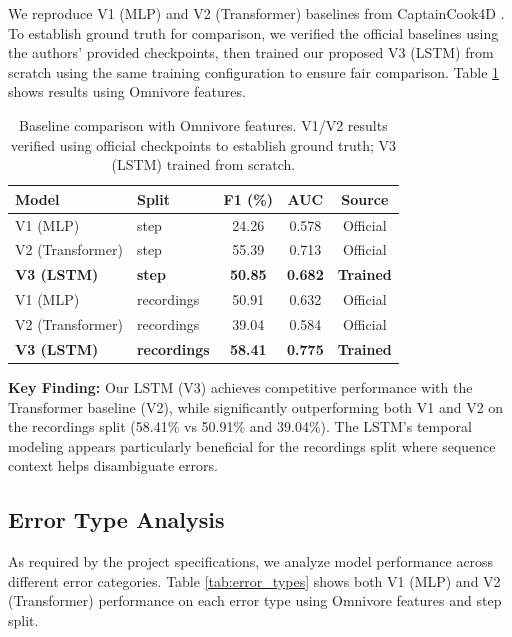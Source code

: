\documentclass[10pt,twocolumn,letterpaper]{article}
\newcommand{\tighttabcolsep}{\setlength{\tabcolsep}{3pt}}
\newcommand{\tighttablerowstretch}{\renewcommand{\arraystretch}{1.05}}
\begin{document}
We reproduce V1 (MLP) and V2 (Transformer) baselines from CaptainCook4D \cite{peddi2024captaincook4d}. To establish ground truth for comparison, we verified the official baselines using the authors' provided checkpoints, then trained our proposed V3 (LSTM) from scratch using the same training configuration to ensure fair comparison. Table \ref{tab:baseline_comparison} shows results using Omnivore features.

\begin{table}[t]
\centering
\caption{Baseline comparison with Omnivore features. V1/V2 results verified using official checkpoints to establish ground truth; V3 (LSTM) trained from scratch.}
\label{tab:baseline_comparison}
{\small\tighttabcolsep\tighttablerowstretch
\begin{tabular}{llccc}
\toprule
Model & Split & F1 (\%) & AUC & Source \\
\midrule
V1 (MLP) & step & 24.26 & 0.578 & Official \\
V2 (Transformer) & step & 55.39 & 0.713 & Official \\
\textbf{V3 (LSTM)} & \textbf{step} & \textbf{50.85} & \textbf{0.682} & \textbf{Trained} \\
\midrule
V1 (MLP) & recordings & 50.91 & 0.632 & Official \\
V2 (Transformer) & recordings & 39.04 & 0.584 & Official \\
\textbf{V3 (LSTM)} & \textbf{recordings} & \textbf{58.41} & \textbf{0.775} & \textbf{Trained} \\
\bottomrule
\end{tabular}
}
\end{table}

\textbf{Key Finding:} Our LSTM (V3) achieves competitive performance with the Transformer baseline (V2), while significantly outperforming both V1 and V2 on the recordings split (58.41\% vs 50.91\% and 39.04\%). The LSTM's temporal modeling appears particularly beneficial for the recordings split where sequence context helps disambiguate errors.

\subsection{Error Type Analysis}

As required by the project specifications, we analyze model performance across different error categories. Table \ref{tab:error_types} shows both V1 (MLP) and V2 (Transformer) performance on each error type using Omnivore features and step split.
\end{document}
